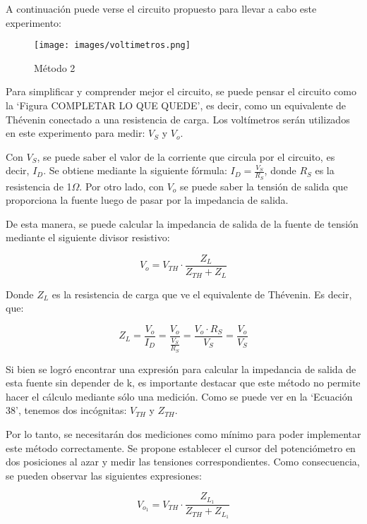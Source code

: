 \documentclass[12pt,oneside,a4paper]{article}
\begin{document}
A continuación puede verse el circuito propuesto para llevar a cabo este experimento:

\begin{figure}[H]
    \centering
    \texttt{[image: images/voltimetros.png]}
    \caption{Método 2}
\end{figure}

Para simplificar y comprender mejor el circuito, se puede pensar el circuito como la \enquote*{Figura COMPLETAR LO QUE QUEDE},
es decir, como un equivalente de Thévenin conectado a una resistencia de carga. Los voltímetros serán 
utilizados en este experimento para medir: $V_S$ y $V_o$. 

Con $V_S$, se puede saber el valor de la corriente que circula por el circuito, es decir, $I_D$. 
Se obtiene mediante la siguiente fórmula: $I_D = \frac{V_S}{R_S}$, donde $R_S$ es la resistencia de 
1$\Omega$. Por otro lado, con $V_o$ se puede saber la tensión de salida que proporciona la fuente 
luego de pasar por la impedancia de salida.

De esta manera, se puede calcular la impedancia de salida de la fuente de tensión mediante el 
siguiente divisor resistivo:

\begin{equation}
    V_o = V_{TH} \cdot \frac{Z_{L}}{Z_{TH} + Z_L}
\end{equation}

Donde $Z_L$ es la resistencia de carga que ve el equivalente de Thévenin. Es decir, que: 

\begin{equation}
    Z_L = \frac{V_o}{I_D} = \frac{V_o}{\frac{V_S}{R_S}} = \frac{V_o \cdot R_S}{V_S} = \frac{V_o}{V_{S}}
\end{equation}

Si bien se logró encontrar una expresión para calcular la impedancia de salida de esta fuente sin 
depender de k, es importante destacar que este método no permite hacer el cálculo mediante sólo una 
medición. Como se puede ver en la \enquote*{Ecuación 38}, tenemos dos incógnitas: $V_{TH}$ y $Z_{TH}$.

Por lo tanto, se necesitarán dos mediciones como mínimo para poder implementar este método correctamente.
Se propone establecer el cursor del potenciómetro en dos posiciones al azar y medir las tensiones 
correspondientes. Como consecuencia, se pueden observar las siguientes expresiones:

\begin{equation}
    V_{o_1} = V_{TH} \cdot \frac{Z_{L_1}}{Z_{TH} + Z_{L_1}}
\end{equation}
\end{document}
